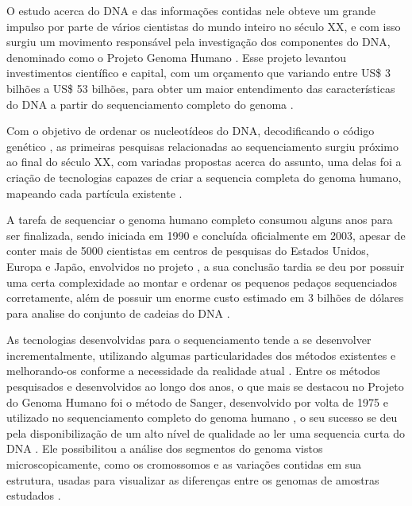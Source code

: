 O estudo acerca do DNA e das informações contidas nele obteve um grande impulso por parte de vários cientistas do mundo inteiro no século XX, e com isso surgiu um movimento responsável pela investigação dos componentes do DNA, denominado como o Projeto Genoma Humano \cite{Lander2001}. Esse projeto levantou investimentos científico e capital, com um orçamento que variando entre US\$ 3 bilhões a US\$ 53 bilhões, para obter um maior entendimento das características do DNA a partir do sequenciamento completo do genoma \cite{Marian2011}. 

Com o objetivo de ordenar os nucleotídeos do DNA, decodificando o código genético \cite{Edwards2011}, as primeiras pesquisas relacionadas ao sequenciamento surgiu próximo ao final do século XX, com variadas propostas acerca do assunto, uma delas foi a criação de tecnologias capazes de criar a sequencia completa do genoma humano, mapeando cada partícula existente \cite{Lander2001,HutchisonIII2007}.

A tarefa de sequenciar o genoma humano completo consumou alguns anos para ser finalizada, sendo iniciada em 1990 e concluída oficialmente em 2003, apesar de conter mais de 5000 cientistas em centros de pesquisas do Estados Unidos, Europa e Japão, envolvidos no projeto \cite{HutchisonIII2007}, a sua conclusão tardia se deu por possuir uma certa complexidade ao montar e ordenar os pequenos pedaços sequenciados corretamente, além de possuir um enorme custo estimado em 3 bilhões de dólares para analise do conjunto de cadeias do DNA \cite{Rye2017,HutchisonIII2007}.

As tecnologias desenvolvidas para o sequenciamento tende a se desenvolver incrementalmente, utilizando algumas particularidades dos métodos existentes e melhorando-os conforme a necessidade da realidade atual \cite{HutchisonIII2007}. Entre os métodos pesquisados e desenvolvidos ao longo dos anos, o que mais se destacou no Projeto do Genoma Humano foi o método de Sanger, desenvolvido por volta de 1975 \cite{Sanger1975} e utilizado no sequenciamento completo do genoma humano \cite{HutchisonIII2007}, o seu sucesso se deu pela disponibilização de um alto nível de qualidade ao ler uma sequencia curta do DNA \cite{Edwards2011}. Ele possibilitou a análise dos segmentos do genoma vistos microscopicamente, como os cromossomos e as variações contidas em sua estrutura, usadas para visualizar as diferenças entre os genomas de amostras estudados \cite{Feuk2006,Sanger1975}. 

